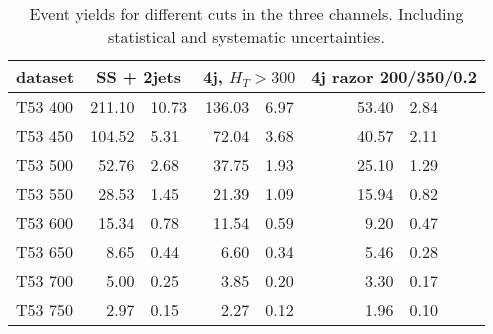\begin{table}
    \centering
    \begin{tabular}{l *3{r@{$\pm$}l}}
        \toprule
        dataset & \multicolumn{2}{c}{SS + 2jets}& \multicolumn{2}{c}{4j, $H_T >
        300$}& \multicolumn{2}{c}{4j razor 200/350/0.2} \\
        \midrule
        T53 400& 211.10 & 10.73& 136.03 & 6.97& 53.40 & 2.84\\
        T53 450& 104.52 & 5.31& 72.04 & 3.68& 40.57 & 2.11\\
        T53 500& 52.76 & 2.68& 37.75 & 1.93& 25.10 & 1.29\\
        T53 550& 28.53 & 1.45& 21.39 & 1.09& 15.94 & 0.82\\
        T53 600& 15.34 & 0.78& 11.54 & 0.59& 9.20 & 0.47\\
        T53 650& 8.65 & 0.44& 6.60 & 0.34& 5.46 & 0.28\\
        T53 700& 5.00 & 0.25& 3.85 & 0.20& 3.30 & 0.17\\
        T53 750& 2.97 & 0.15& 2.27 & 0.12& 1.96 & 0.10\\
        \bottomrule
    \end{tabular}
    \caption{Event yields for different cuts in the three channels. Including
    statistical and systematic uncertainties.}
\end{table}

